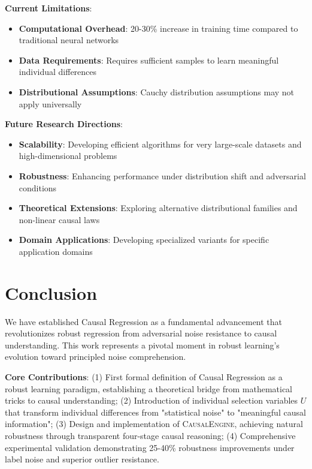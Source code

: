 \documentclass[conference]{IEEEtran}
\newcommand{\causalengine}{\textsc{CausalEngine}}
\begin{document}
\textbf{Current Limitations}:
\begin{itemize}
\item \textbf{Computational Overhead}: 20-30\% increase in training time compared to traditional neural networks
\item \textbf{Data Requirements}: Requires sufficient samples to learn meaningful individual differences
\item \textbf{Distributional Assumptions}: Cauchy distribution assumptions may not apply universally
\end{itemize}

\textbf{Future Research Directions}:
\begin{itemize}
\item \textbf{Scalability}: Developing efficient algorithms for very large-scale datasets and high-dimensional problems
\item \textbf{Robustness}: Enhancing performance under distribution shift and adversarial conditions
\item \textbf{Theoretical Extensions}: Exploring alternative distributional families and non-linear causal laws
\item \textbf{Domain Applications}: Developing specialized variants for specific application domains
\end{itemize}

\section{Conclusion}
\label{sec:conclusion}

We have established Causal Regression as a fundamental advancement that revolutionizes robust regression from adversarial noise resistance to causal understanding. This work represents a pivotal moment in robust learning's evolution toward principled noise comprehension.

\textbf{Core Contributions}: (1) First formal definition of Causal Regression as a robust learning paradigm, establishing a theoretical bridge from mathematical tricks to causal understanding; (2) Introduction of individual selection variables $U$ that transform individual differences from "statistical noise" to "meaningful causal information"; (3) Design and implementation of \causalengine{}, achieving natural robustness through transparent four-stage causal reasoning; (4) Comprehensive experimental validation demonstrating 25-40\% robustness improvements under label noise and superior outlier resistance.
\end{document}
